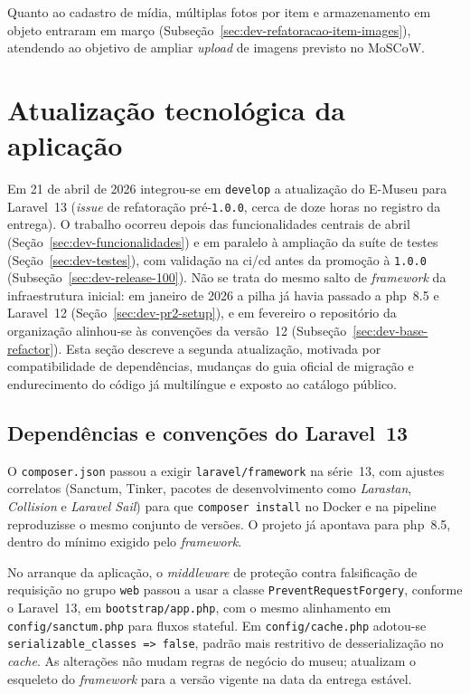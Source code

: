 Quanto ao cadastro de mídia, múltiplas fotos por item e armazenamento em objeto entraram em março (Subseção~\ref{sec:dev-refatoracao-item-images}), atendendo ao objetivo de ampliar \textit{upload} de imagens previsto no MoSCoW.


\section{Atualização tecnológica da aplicação}\label{sec:dev-stack-upgrade}

Em 21 de abril de 2026 integrou-se em \texttt{develop} a atualização do E-Museu para Laravel~13 (\textit{issue} de refatoração pré-\texttt{1.0.0}, cerca de doze horas no registro da entrega). O trabalho ocorreu depois das funcionalidades centrais de abril (Seção~\ref{sec:dev-funcionalidades}) e em paralelo à ampliação da suíte de testes (Seção~\ref{sec:dev-testes}), com validação na \acrfull{ci/cd} antes da promoção à \texttt{1.0.0} (Subseção~\ref{sec:dev-release-100}). Não se trata do mesmo salto de \textit{framework} da infraestrutura inicial: em janeiro de 2026 a pilha já havia passado a \acrshort{php}~8.5 e Laravel~12 (Seção~\ref{sec:dev-pr2-setup}), e em fevereiro o repositório da organização alinhou-se às convenções da versão~12 (Subseção~\ref{sec:dev-base-refactor}). Esta seção descreve a segunda atualização, motivada por compatibilidade de dependências, mudanças do guia oficial de migração e endurecimento do código já multilíngue e exposto ao catálogo público.


\subsection{Dependências e convenções do Laravel~13}\label{sec:dev-laravel13-deps}

O \texttt{composer.json} passou a exigir \texttt{laravel/framework} na série~13, com ajustes correlatos (Sanctum, Tinker, pacotes de desenvolvimento como \textit{Larastan}, \textit{Collision} e \textit{Laravel Sail}) para que \texttt{composer install} no Docker e na pipeline reproduzisse o mesmo conjunto de versões. O projeto já apontava para \acrshort{php}~8.5, dentro do mínimo exigido pelo \textit{framework}.

No arranque da aplicação, o \textit{middleware} de proteção contra falsificação de requisição no grupo \texttt{web} passou a usar a classe \texttt{PreventRequestForgery}, conforme o Laravel~13, em \texttt{bootstrap/app.php}, com o mesmo alinhamento em \texttt{config/sanctum.php} para fluxos stateful. Em \texttt{config/cache.php} adotou-se \texttt{serializable\_classes => false}, padrão mais restritivo de desserialização no \textit{cache}. As alterações não mudam regras de negócio do museu; atualizam o esqueleto do \textit{framework} para a versão vigente na data da entrega estável.


